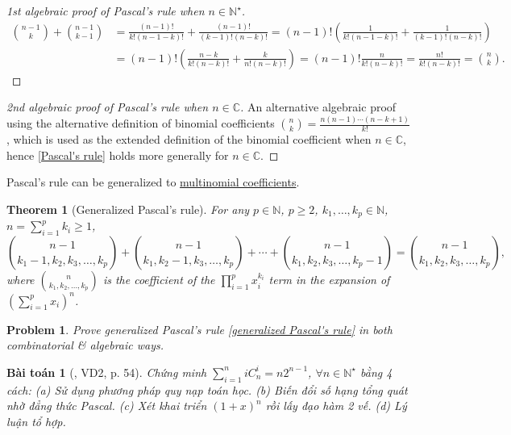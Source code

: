 \documentclass[oneside]{book}
\newtheorem{baitoan}{Bài toán}
\newtheorem{problem}{Problem}
\newtheorem{theorem}{Theorem}
\begin{document}
\begin{proof}[1st algebraic proof of Pascal's rule when $n\in\mathbb{N}^\star$]
	\begin{align*}
		\binom{n - 1}{k} + \binom{n - 1}{k - 1} &= \frac{(n - 1)!}{k!(n - 1 - k)!} + \frac{(n - 1)!}{(k - 1)!(n - k)!} = (n - 1)!\left(\frac{1}{k!(n - 1 - k)!} + \frac{1}{(k - 1)!(n - k)!}\right)\\
		&= (n - 1)!\left(\frac{n - k}{k!(n - k)!} + \frac{k}{n!(n - k)!}\right) = (n - 1)!\frac{n}{k!(n - k)!} = \frac{n!}{k!(n - k)!} = \binom{n}{k}.
	\end{align*}
\end{proof}

\begin{proof}[2nd algebraic proof of Pascal's rule when $n\in\mathbb{C}$]
	An alternative algebraic proof using the alternative definition of binomial coefficients $\binom{n}{k} = \frac{n(n - 1)\cdots(n - k + 1)}{k!}$, which is used as the extended definition of the binomial coefficient when $n\in\mathbb{C}$, hence \eqref{Pascal's rule} holds more generally for $n\in\mathbb{C}$.
\end{proof}
Pascal's rule can be generalized to \href{https://en.wikipedia.org/wiki/Multinomial_coefficient}{multinomial coefficients}.

\begin{theorem}[Generalized Pascal's rule]
	For any $p\in\mathbb{N}$, $p\ge2$, $k_1,\ldots,k_p\in\mathbb{N}$, $n = \sum_{i=1}^p k_i\ge1$,
	\begin{equation}
		\label{generalized Pascal's rule}
		\tag{gPasr}
		\binom{n - 1}{k_1 - 1,k_2,k_3,\ldots,k_p} + \binom{n - 1}{k_1,k_2 - 1,k_3,\ldots,k_p} + \cdots + \binom{n - 1}{k_1,k_2,k_3,\ldots,k_p - 1} = \binom{n - 1}{k_1,k_2,k_3,\ldots,k_p},
	\end{equation}
	where $\binom{n}{k_1,k_2,\ldots,k_p}$ is the coefficient of the $\prod_{i=1}^p x_i^{k_i}$ term in the expansion of $\left(\sum_{i=1}^p x_i\right)^n$.
\end{theorem}

\begin{problem}
	Prove generalized Pascal's rule \eqref{generalized Pascal's rule} in both combinatorial \& algebraic ways.
\end{problem}


\begin{baitoan}[\cite{Phuong_to_hop}, VD2, p. 54]
	Chứng minh $\sum_{i=1}^n iC_n^i = n2^{n-1}$, $\forall n\in\mathbb{N}^\star$ bằng 4 cách: (a) Sử dụng phương pháp quy nạp toán học. (b) Biến đổi số hạng tổng quát nhờ đẳng thức Pascal. (c) Xét khai triển $(1 + x)^n$ rồi lấy đạo hàm 2 vế. (d) Lý luận tổ hợp.
\end{baitoan}
\end{document}
